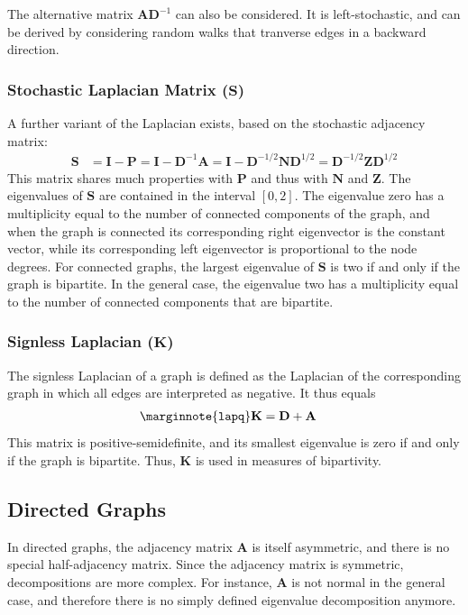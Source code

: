 \documentclass{article}
\begin{document}
The alternative matrix $\mathbf A \mathbf D^{-1}$ can also be
considered.  It is left-stochastic, and
can be derived by considering random walks that tranverse edges in a
backward direction. 

\subsubsection{Stochastic Laplacian Matrix ($\mathbf S$)}
A further variant of the Laplacian exists, based on the stochastic
adjacency matrix:
\begin{align*}
  \mathbf S &= \mathbf I - \mathbf P = \mathbf I - \mathbf D^{-1}
  \mathbf A = \mathbf I - \mathbf D^{-1/2} \mathbf N \mathbf D^{1/2} =
  \mathbf D^{-1/2} \mathbf Z \mathbf D^{1/2}
\end{align*}
This matrix shares much properties with $\mathbf P$ and thus with
$\mathbf N$ and $\mathbf Z$.  The eigenvalues of $\mathbf S$ are
contained in the interval $[0, 2]$.  The eigenvalue zero has a
multiplicity equal to the number of connected components of the graph,
and when the graph is connected its corresponding right eigenvector is the
constant vector, while its corresponding left eigenvector is
proportional to the node degrees.  For connected graphs, the largest
eigenvalue of $\mathbf S$ is two if and only if the graph is bipartite.
In the general case, the eigenvalue two has a multiplicity equal to the
number of connected components that are bipartite. 

\subsubsection{Signless Laplacian ($\mathbf K$)}
The signless Laplacian of a graph is defined as the Laplacian of the
corresponding graph in which all edges are interpreted as negative.  It
thus equals
\begin{align}
  \marginnote{\texttt{lapq}}
  \mathbf K &= \mathbf D + \mathbf A
\end{align}
This matrix is positive-semidefinite, and its smallest eigenvalue is
zero if and only if the graph is bipartite.  Thus, $\mathbf K$ is used
in measures of bipartivity. 

\subsection{Directed Graphs}
In directed graphs, the adjacency matrix $\mathbf A$ is itself
asymmetric, and there is no special half-adjacency matrix.  Since the
adjacency matrix is symmetric, decompositions are more complex.  For
instance, $\mathbf A$ is not normal in the general case, and therefore
there is no simply defined eigenvalue decomposition anymore. 
\end{document}
